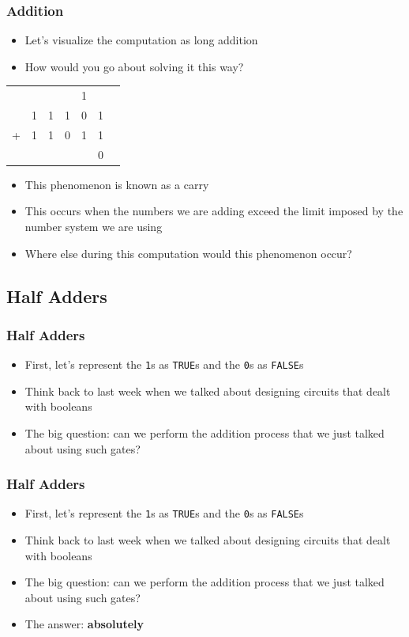\documentclass{beamer}
\begin{document}
		\begin{frame}
    		\frametitle{Addition}
    		\begin{itemize}
    			\item Let's visualize the computation as long addition
    			\item How would you go about solving it this way?
			\end{itemize}
			
			\centering
			{\LARGE
			\begin{tabular}{c@{\,}c@{\,}c@{\,}c@{\,}c@{\,}c@{\,}c}
					   &   &   &   & {\color{red}1} &   \\
					   & 1 & 1 & 1 & 0 & 1 \\
					 + & 1 & 1 & 0 & 1 & 1 \\
					\hline
					   &   &   &   &   & 0
					
			\end{tabular}}
			
			\begin{itemize}
				\item This phenomenon is known as a {\color{red}carry}
				\item This occurs when the numbers we are adding exceed the limit imposed by the number system we are using
				\item Where else during this computation would this phenomenon occur?
			\end{itemize}
		\end{frame}	
		
		\subsection{Half Adders}
		
		\begin{frame}
			\frametitle{Half Adders}
			\begin{itemize}
				\item First, let's represent the \texttt{1}s as \texttt{TRUE}s and the \texttt{0}s as \texttt{FALSE}s
				\item Think back to last week when we talked about designing circuits that dealt with booleans
				\item The big question: can we perform the addition process that we just talked about using such gates?
			\end{itemize}
		\end{frame}
		
		\begin{frame}
			\frametitle{Half Adders}
			\begin{itemize}
				\item First, let's represent the \texttt{1}s as \texttt{TRUE}s and the \texttt{0}s as \texttt{FALSE}s
				\item Think back to last week when we talked about designing circuits that dealt with booleans
				\item The big question: can we perform the addition process that we just talked about using such gates?
				\item The answer: \textbf{absolutely}
			\end{itemize}
		\end{frame}
		
\end{document}
